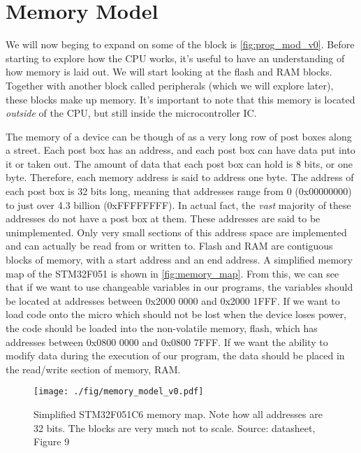\chapter{Memory Model}
We will now beging to expand on some of the block is \autoref{fig:prog_mod_v0}. Before starting to explore how the CPU works, it's useful to have an understanding of how memory is laid out. We will start looking at the flash and RAM blocks. Together with another block called peripherals (which we will explore later), these blocks make up memory. 
It's important to note that this memory is located \emph{outside} of the CPU, but still inside the microcontroller IC.

The memory of a device can be though of as a very long row of post boxes along a street. 
Each post box has an address, and each post box can have data put into it or taken out. The amount of data that each post box can hold is 8 bits, or one byte. Therefore, each memory address is said to address one byte. 
The address of each post box is 32 bits long, meaning that addresses range from 0 (0x00000000) to just over 4.3 billion (0xFFFFFFFF). In actual fact, the \emph{vast} majority of these addresses do not have a post box at them. These addresses are said to be unimplemented. 
Only very small sections of this address space are implemented and can actually be read from or written to.
Flash and RAM are contiguous blocks of memory, with a start address and an end address. A simplified memory map of the STM32F051 is shown in \autoref{fig:memory_map}. From this, we can see that if we want to use changeable variables in our programs, the variables should be located at addresses between 0x2000 0000 and 0x2000 1FFF. If we want to load code onto the micro which should not be lost when the device loses power, the code should be loaded into the non-volatile memory, flash, which has addresses between 0x0800 0000 and 0x0800 7FFF.
If we want the ability to modify data during the execution of our program, the data should be placed in the read/write section of memory, RAM. 

\begin{figure}
  \centering
  \texttt{[image: ./fig/memory\_model\_v0.pdf]}
  \caption{Simplified STM32F051C6 memory map. Note how all addresses are 32 bits. The blocks are very much not to scale. Source: datasheet, Figure 9}
  \label{fig:memory_map}
\end{figure}

